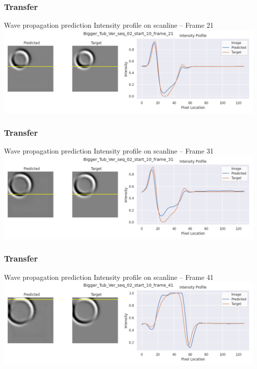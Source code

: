 \begin{frame}
    \frametitle{Transfer}

Wave propagation prediction \newline
Intensity profile on scanline -- Frame 21\\[\baselineskip]

\includegraphics[width=\textwidth, height=.55\textheight]{./Ressourcen/Praesentation/Bilder/WaveTransfer/DFP/Bigger_Tub_Ver_seq_02_start_10_frame_21.png}%

\end{frame}
\clearpage
\begin{frame}
    \frametitle{Transfer}

Wave propagation prediction \newline
Intensity profile on scanline -- Frame 31\\[\baselineskip]

\includegraphics[width=\textwidth, height=.55\textheight]{./Ressourcen/Praesentation/Bilder/WaveTransfer/DFP/Bigger_Tub_Ver_seq_02_start_10_frame_31.png}%

\end{frame}
\clearpage
\begin{frame}
    \frametitle{Transfer}

Wave propagation prediction \newline
Intensity profile on scanline -- Frame 41\\[\baselineskip]

\includegraphics[width=\textwidth, height=.55\textheight]{./Ressourcen/Praesentation/Bilder/WaveTransfer/DFP/Bigger_Tub_Ver_seq_02_start_10_frame_41.png}%

\end{frame}
